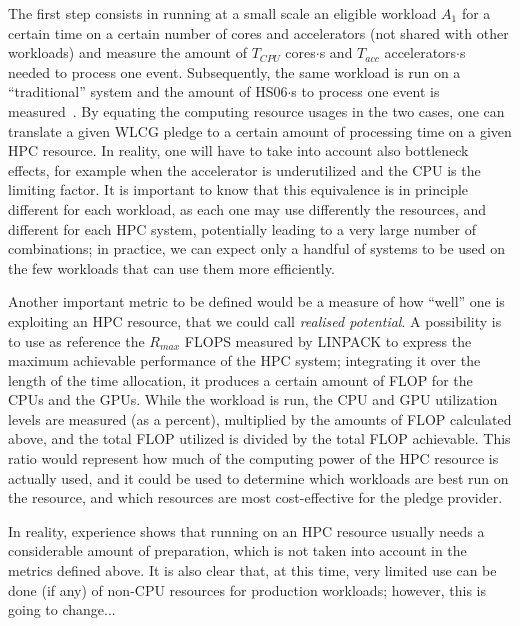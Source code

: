 The first step consists in running at a small scale an eligible
workload $A_1$ for a certain time on a certain number of cores and
accelerators (not shared with other workloads) and measure the amount
of $T_{CPU}$ cores$\cdot$s and $T_{acc}$ accelerators$\cdot$s needed
to process one event. Subsequently, the same workload is run on a
``traditional'' system and the amount of HS06$\cdot$s to process one
event is measured~\cite{hs06}. By equating the computing resource
usages in the two cases, one can translate a given WLCG pledge to a
certain amount of processing time on a given HPC resource. In reality,
one will have to take into account also bottleneck effects, for
example when the accelerator is underutilized and the CPU is the
limiting factor. It is important to know that this equivalence is in
principle different for each workload, as each one may use differently
the resources, and different for each HPC system, potentially leading
to a very large number of combinations; in practice, we can expect
only a handful of systems to be used on the few workloads that can use
them more efficiently.

Another important metric to be defined would be a measure of how
``well'' one is exploiting an HPC resource, that we could call
\emph{realised potential}. A possibility is to use as reference the
$R_{max}$ FLOPS measured by LINPACK to express the
maximum achievable performance of the HPC system; integrating it over
the length of the time allocation, it produces a certain amount of
FLOP for the CPUs and the GPUs. While the workload is run, the CPU and
GPU utilization levels are measured (as a percent), multiplied by the
amounts of FLOP calculated above, and the total FLOP utilized is
divided by the total FLOP achievable. This ratio would represent how
much of the computing power of the HPC resource is actually used, and
it could be used to determine which workloads are best run on the
resource, and which resources are most cost-effective for the pledge
provider.

In reality, experience shows that running on an HPC resource usually
needs a considerable amount of preparation, which is not taken into
account in the metrics defined above. It is also clear that, at this
time, very limited use can be done (if any) of non-CPU resources for
production workloads; however, this is going to change...
